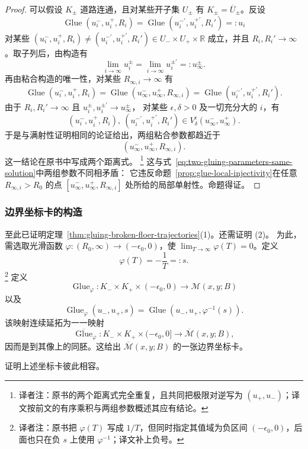 \begin{proof}
可以假设 $K_\pm$ 道路连通，且对某些开子集 $U_\pm$ 有
$K_\pm=\overline U_\pm$。反设
\begin{equation}
 \operatorname{Glue}(u_i^-,u_i^+,R_i)
 =\operatorname{Glue}(u_i^{-'},u_i^{+'},R_i')=:u_i
 \label{eq:two-gluing-parameters-same-solution}
\end{equation}
对某些
$(u_i^-,u_i^+,R_i)\neq(u_i^{-'},u_i^{+'},R_i')\in U_-\times U_+\times\mathbb R$
成立，并且 $R_i,R_i'\to\infty$。取子列后，由构造有
\[
 \lim_{i\to\infty}u_i^\pm
 =\lim_{i\to\infty}u_i^{\pm'}=:u_\infty^\pm.
\]
再由粘合构造的唯一性，对某些 $R_{\infty,i}\to\infty$ 有
\[
 \operatorname{Glue}(u_i^-,u_i^+,R_i)
 =\operatorname{Glue}(u_\infty^-,u_\infty^+,R_{\infty,i})
 =\operatorname{Glue}(u_i^{-'},u_i^{+'},R_i').
\]
由于 $R_i,R_i'\to\infty$ 且 $u_i^\pm,u_i^{\pm'}\to u_\infty^\pm$，
对某些 $\epsilon,\delta>0$ 及一切充分大的 $i$，有
\[
 (u_i^-,u_i^+,R_i),\ (u_i^{-'},u_i^{+'},R_i')
 \in V_\delta^\epsilon(u_\infty^-,u_\infty^+).
\]
于是与满射性证明相同的论证给出，两组粘合参数都趋近于
\[
 (u_\infty^-,u_\infty^+,R_{\infty,i}).
\]
这一结论在原书中写成两个距离式。
\footnote{译者注：原书的两个距离式完全重复，且共同把极限对逆写为
$(u_+,u_-)$；译文按前文的有序乘积与两组参数概述其应有结论。}
这与式~\eqref{eq:two-gluing-parameters-same-solution}中两组参数不同相矛盾：
它违反命题~\ref{prop:glue-local-injectivity}在任意
$R_{\infty,i}>R_0$ 的点
$[u_\infty^-,u_\infty^+,R_{\infty,i}]$ 处所给的局部单射性。命题得证。
\end{proof}

\subsubsection*{边界坐标卡的构造}
至此已证明定理~\ref{thm:gluing-broken-floer-trajectories}(1)。还需证明 (2)。
为此，需选取光滑函数
$\varphi:(R_0,\infty)\to(-\epsilon_0,0)$，使
$\lim_{T\to\infty}\varphi(T)=0$。定义
\[
 \varphi(T)=-\frac1T=:s.
\]
\footnote{译者注：原书把 $\varphi(T)$ 写成 $1/T$，但同时指定其值域为负区间
$(-\epsilon_0,0)$，后面也只在负 $s$ 上使用 $\varphi^{-1}$；译文补上负号。}
定义
\[
 \operatorname{Glue}_\varphi:
 K_-\times K_+\times(-\epsilon_0,0)\longrightarrow\mathcal M(x,y;B)
\]
以及
\[
 \operatorname{Glue}_\varphi(u_-,u_+,s)
 =\operatorname{Glue}(u_-,u_+,\varphi^{-1}(s)).
\]
该映射连续延拓为一一映射
\[
 \overline{\operatorname{Glue}}_\varphi:
 K_-\times K_+\times(-\epsilon_0,0]
 \longrightarrow\overline{\mathcal M}(x,y;B),
\]
因而是到其像上的同胚。这给出 $\overline{\mathcal M}(x,y;B)$ 的一张边界坐标卡。

\begin{exercise}
\label{ex:compatibility-gluing-boundary-charts}
证明上述坐标卡彼此相容。
\end{exercise}
